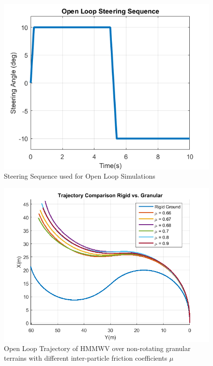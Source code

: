 \documentclass[12pt,onecolumn]{report}
\begin{document}
\begin{figure}
	\centering
	\includegraphics[width=0.8\columnwidth]{Figs/openLoopSteer.png}
	\caption{\small Steering Sequence used for Open Loop Simulations}  
	\label{fig:openSteer}
\end{figure}

\begin{figure}
	\centering
	\includegraphics[width=0.8\columnwidth]{Figs/trajectoryComparison_png.png}
	\caption{\small Open Loop Trajectory of HMMWV over non-rotating granular terrains with different inter-particle friction coefficients $\mu$}  
	\label{fig:openLoopmu}
\end{figure}
\end{document}
